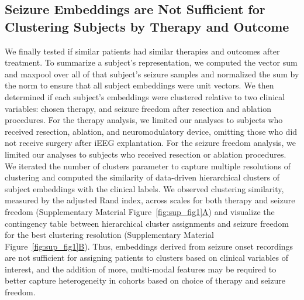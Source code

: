 \documentclass[11pt]{article}
\begin{document}
\subsection*{Seizure Embeddings are Not Sufficient for Clustering Subjects by Therapy and Outcome}
We finally tested if similar patients had similar therapies and outcomes after treatment. To summarize a subject’s representation, we computed the vector sum and maxpool over all of that subject’s seizure samples and normalized the sum by the norm to ensure that all subject embeddings were unit vectors. We then determined if each subject’s embeddings were clustered relative to two clinical variables: chosen therapy, and seizure freedom after resection and ablation procedures. For the therapy analysis, we limited our analyses to subjects who received resection, ablation, and neuromodulatory device, omitting those who did not receive surgery after iEEG explantation. For the seizure freedom analysis, we limited our analyses to subjects who received resection or ablation procedures. We iterated the number of clusters parameter to capture multiple resolutions of clustering and computed the similarity of data-driven hierarchical clusters of subject embeddings with the clinical labels. We observed clustering similarity, measured by the adjusted Rand index, across scales for both therapy and seizure freedom (Supplementary Material Figure~\hyperref[fig:sup_fig1]{\ref*{fig:sup_fig1}A}) and visualize the contingency table between hierarchical cluster assignments and seizure freedom for the best clustering resolution (Supplementary Material Figure~\hyperref[fig:sup_fig1]{\ref*{fig:sup_fig1}B}). Thus, embeddings derived from seizure onset recordings are not sufficient for assigning patients to clusters based on clinical variables of interest, and the addition of more, multi-modal features may be required to better capture heterogeneity in cohorts based on choice of therapy and seizure freedom.
\end{document}
